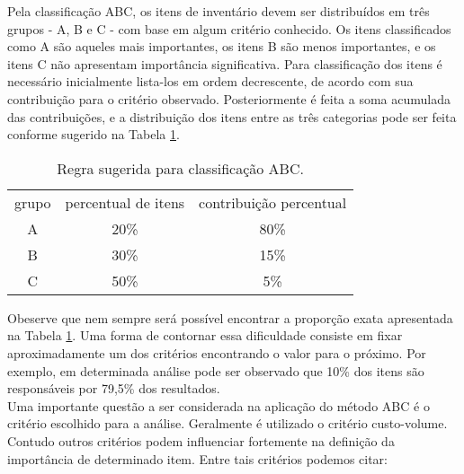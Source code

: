 \documentclass{book}
\begin{document}
Pela classificação ABC, os itens de inventário devem ser distribuídos em três grupos - A, B e C - com base em algum critério conhecido. Os itens classificados como A são aqueles mais importantes, os itens B são menos importantes, e os itens C não apresentam importância significativa. Para classificação dos itens é necessário inicialmente lista-los em ordem decrescente, de acordo com sua contribuição para o critério observado. Posteriormente é feita a soma acumulada das contribuições, e a distribuição dos itens entre as três categorias pode ser feita conforme sugerido na Tabela \ref{tab:ABCRules}. \\

\begin{table}[h]
\begin{center}
\begin{tabular}[c]{c c c}
\cline {1-3}
grupo & percentual de itens & contribuição percentual \\ \cline {1-3}
A & 20\% &  80\%   \\ 
B & 30\% &  15\%   \\
C & 50\% &  5\% \\ \cline {1-3}
\end{tabular}
\label{tab:ABCRules}
\caption{Regra sugerida para classificação ABC.}
\end{center}
\end{table}

Obeserve que nem sempre será possível encontrar a proporção exata apresentada na Tabela \ref{tab:ABCRules}. Uma forma de contornar essa dificuldade consiste em fixar aproximadamente um dos critérios encontrando o valor para o próximo. Por exemplo, em determinada análise pode ser observado que 10\% dos itens são responsáveis por 79,5\% dos resultados. \\

Uma importante questão a ser considerada na aplicação do método ABC é o critério escolhido para a análise. Geralmente é utilizado o critério custo-volume. Contudo outros critérios podem influenciar fortemente na definição da importância de determinado item. Entre tais critérios podemos citar:
\end{document}
